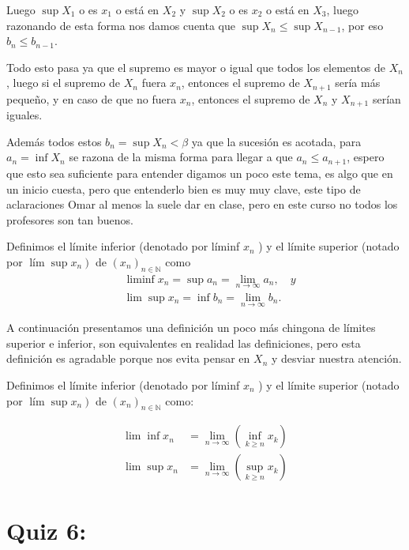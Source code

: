\begin{itemize}[label={✎},leftmargin=*]
\begin{note}
Luego $\sup X_1$ o es $x_1$ o está en $X_2$ y $\sup X_2$ o es $x_2$ o está en $X_3$, luego razonando de esta forma nos damos cuenta que $\sup X_n\leq \sup X_{n-1}$, por eso $b_n\leq b_{n-1}$.
\end{note}

\begin{note}
Todo esto pasa ya que el supremo es mayor o igual que todos los elementos de $X_n$, luego si el supremo de $X_n$ fuera $x_n$, entonces el supremo de $X_{n+1}$ sería más pequeño, y en caso de que no fuera $x_n$, entonces el supremo de $X_n$ y $X_{n+1}$ serían iguales.
\end{note}

Además todos estos $b_n=\sup X_n<\beta$ ya que la sucesión es acotada, para $a_n=\inf X_n$ se razona de la misma forma para llegar a que $a_n\leq a_{n+1}$, espero que esto sea suficiente para entender digamos un poco este tema, es algo que en un inicio cuesta, pero que entenderlo bien es muy muy clave, este tipo de aclaraciones Omar al menos la suele dar en clase, pero en este curso no todos los profesores son tan buenos. 



\begin{definition}
Definimos el límite inferior (denotado por líminf $x_n$ ) y el límite superior (notado por $\left.\operatorname{lím} \sup x_n\right)$ de $\left(x_n\right)_{n \in \mathbb{N}}$ como
$$
\begin{aligned}
& \liminf x_n=\sup a_n=\lim _{n \rightarrow \infty} a_n, \quad y \\
& \lim \sup x_n=\inf b_n=\lim _{n \rightarrow \infty} b_n .
\end{aligned}
$$    
\end{definition}

A continuación presentamos una definición un poco más chingona de límites superior e inferior, son equivalentes en realidad las definiciones, pero esta definición es agradable porque nos evita pensar en $X_n$ y desviar nuestra atención.

\begin{definition}

Definimos el límite inferior (denotado por líminf $x_n$ ) y el límite superior (notado por $\left.\operatorname{lím} \sup x_n\right)$ de $\left(x_n\right)_{n \in \mathbb{N}}$ como:

$$    \begin{aligned}
\lim \inf x_n & =\lim _{n \rightarrow \infty}\left(\inf _{k \geq n} x_k\right) \\
\lim \sup x_n & =\lim _{n \rightarrow \infty}\left(\sup _{k \geq n} x_k\right)
\end{aligned}$$

\end{definition}


\section{Quiz 6:}

\end{itemize}

